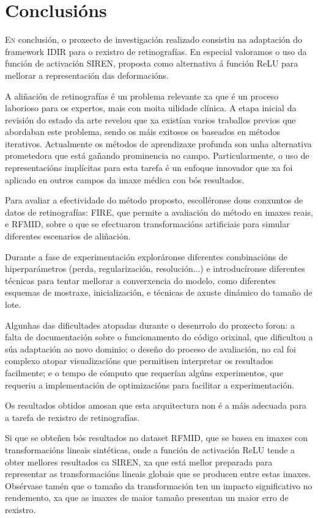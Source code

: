 \chapter{Conclusións}
\label{chap:Conclusións}

\lettrine{E}{n} conclusión, o proxecto de investigación realizado consistiu na adaptación do framework IDIR para o rexistro de retinografías.
En especial valoramos o uso da función de activación SIREN, proposta como alternativa á función ReLU para mellorar a representación das deformacións.

A aliñación de retinografías é un problema relevante xa que é un proceso laborioso para os expertos, mais con moita uilidade clínica.
A etapa inicial da revisión do estado da arte revelou que xa existían varios traballos previos que abordaban este problema, sendo os máis exitosos os baseados en métodos iterativos.
Actualmente os métodos de aprendizaxe profunda son unha alternativa prometedora que está gañando prominencia no campo. Particularmente, o uso de representacións implícitas para esta tarefa é un enfoque innovador que xa foi aplicado en outros campos da imaxe médica con bós resultados.

Para avaliar a efectividade do método proposto, escolléronse dous conxuntos de datos de retinografías: FIRE, que permite a avaliación do método en imaxes reais, e RFMID, sobre o que se efectuaron transformacións artificiais para simular diferentes escenarios de aliñación.

Durante a fase de experimentación exploráronse diferentes combinacións de hiperparámetros (perda, regularización, resolución...) e introducíronse diferentes técnicas para tentar mellorar a converxencia do modelo, como diferentes esquemas de mostraxe, inicialización, e técnicas de axuste dinámico do tamaño de lote.

Algunhas das dificultades atopadas durante o desenrrolo do proxecto foron: a falta de documentación sobre o funcionamento do código orixinal, que dificultou a súa adaptación ao novo dominio; o deseño do proceso de avaliación, no cal foi complexo atopar visualizacións que permitisen interpretar os resultados facilmente; e o tempo de cómputo que requerían algúns experimentos, que requeriu a implementación de optimizacións para facilitar a experimentación.

Os resultados obtidos amosan que esta arquitectura non é a máis adecuada para a tarefa de rexistro de retinografías.

Si que se obteñen bós resultados no dataset RFMID, que se basea en imaxes con transformacións lineais sintéticas, onde a función de activación ReLU tende a obter mellores resultados ca SIREN, xa que está mellor preparada para representar as transformacións lineais globais que se producen entre estas imaxes.
Obsérvase tamén que o tamaño da transformación ten un impacto significativo no rendemento, xa que as imaxes de maior tamaño presentan un maior erro de rexistro.

